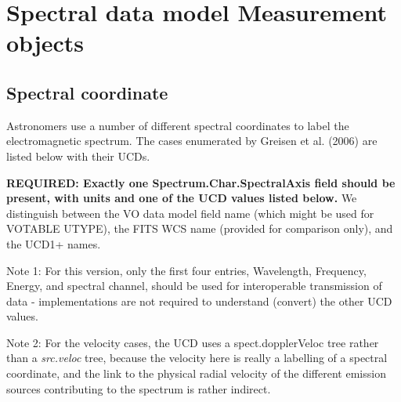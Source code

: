 \documentclass[11pt]{article}
\newcommand{\htwidth}[1]{}
\begin{document}
\htwidth{0}

\section{Spectral data model Measurement objects}

\subsection{Spectral coordinate}

Astronomers use a number of different spectral coordinates
to label the electromagnetic spectrum. The cases enumerated
by Greisen et al. (2006) are listed below with their UCDs.

{\bf REQUIRED: Exactly one Spectrum.Char.SpectralAxis field should be present,
with units and one of the UCD values listed below.}
We distinguish between the VO data model field name (which might
be used for VOTABLE UTYPE),
the FITS WCS name (provided for comparison only), and the UCD1+ names.

Note 1: For this version, only the first four entries, Wavelength,
Frequency, Energy, and spectral channel, should be used for
interoperable transmission of data - implementations are not required to
understand (convert) the other UCD values. 

Note 2: For the velocity cases, the UCD uses a spect.dopplerVeloc tree
rather than a {\it src.veloc } tree, because the velocity here
is really a labelling of a spectral coordinate, and the link to
the physical radial velocity of the different emission sources contributing
to the spectrum is rather indirect.
\end{document}
